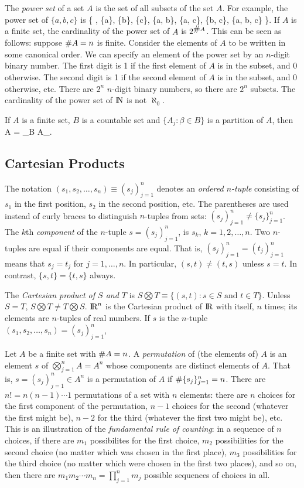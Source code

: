 The {\em power set} of a set $A$ is the set of all subsets of the set $A$.
For example, the power set of $\{a, b, c\}$ is
\beq
        \{ \emptyset, \{a\}, \{b\}, \{c\}, \{a, b\}, \{a, c\}, \{b, c\}, \{a, b, c\} \}.
\eeq
If $A$ is a finite set, the cardinality of the power set of $A$ is $2^{\mbox{\#} A}$.
This can be seen as follows: suppose $\mbox{\#} A = n$ is finite.
Consider the elements of $A$ to be written in some canonical order.
We can specify an element of the power set by an $n$-digit binary number.
The first digit is 1 if the first element of $A$ is in the subset, and 0 otherwise.
The second digit is 1 if the second element of $A$ is in the subset, and 0 otherwise,
etc.
There are $2^n$ $n$-digit binary numbers, so there are $2^n$ subsets.
The cardinality of the power set of $\hbox{I\kern-.17em\hbox{N}}$ is not $\aleph_0$.

If $A$ is a finite set, $B$ is a countable set
and $\{A_j : \beta \in B \}$ is a partition of $A$, then
\beq
        \card A = \sum_{\beta \in B} \card A_\beta.
\eeq

\subsection{Cartesian Products}
The notation $(s_1, s_2, \ldots, s_n) \equiv (s_j)_{j=1}^n$ denotes an 
{\em ordered $n$-tuple\/} consisting of 
$s_1$ in the first position, $s_2$ in the second position, etc.
The parentheses are used instead of curly braces to distinguish 
$n$-tuples from sets: $(s_j)_{j=1}^n \ne \{s_j\}_{j=1}^n$.
The $k$th
{\em component\/} of the $n$-tuple $s = (s_j)_{j=1}^n$, is $s_k$, 
$k = 1, 2, \ldots, n$.
Two $n$-tuples are equal if their components are equal.
That is, $(s_j)_{j=1}^n = (t_j)_{j=1}^n$ means that
$s_j = t_j$ for $j = 1, \ldots, n$.
In particular, $(s, t) \ne (t, s)$ unless $s=t$.
In contrast, $\{s, t \} = \{ t, s \}$ always.

The {\em Cartesian product of $S$ and $T$\/} is
$S \bigotimes T \equiv \{(s, t): s \in S \mbox{ and } t \in T\}$.
Unless $S = T$, $S \bigotimes T \ne T \bigotimes S$.
$\hbox{I\kern-.17em\hbox{R}}^n$ is the Cartesian product of $\hbox{I\kern-.17em\hbox{R}}$ with itself, $n$ times; its elements
are $n$-tuples of real numbers.
If $s$ is the $n$-tuple $(s_1, s_2, \ldots, s_n) = (s_j)_{j=1}^n$, 

Let $A$ be a finite set with $\mbox{\#} A = n$.
A {\em permutation\/} of (the elements of) $A$ is an element $s$ of 
$\bigotimes_{j=1}^n A = A^n$
whose components are distinct elements of $A$.
That is, $s = (s_j)_{j=1}^n \in A^n$ is a permutation of $A$ if
$\mbox{\#} \{s_j\}_{j=1}^n = n$.
There are $n! = n(n-1)\cdots 1$ permutations of a set with $n$ elements:
there are $n$ choices for the first component of the permutation, $n-1$ choices for
the second (whatever the
first might be), $n-2$ for the third (whatever the first two might be), etc.
This is an illustration of the {\em fundamental rule of counting\/}:
in a sequence of $n$ choices, if there are $m_1$ possibilites for the first choice,
$m_2$ possibilities for the second choice (no matter which was chosen in the first place),
$m_3$ possibilities for the third choice 
(no matter which were chosen in the first two places),
and so on, then there are $m_1 m_2 \cdots m_n = \prod_{j=1}^n m_j$ possible sequences
of choices in all.

